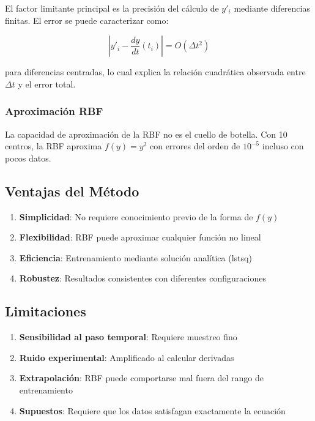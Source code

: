 \documentclass[11pt,a4paper]{article}
\begin{document}
El factor limitante principal es la precisión del cálculo de $y'_i$ mediante diferencias finitas. El error se puede caracterizar como:

\begin{equation}
\left| y'_i - \frac{dy}{dt}(t_i) \right| = O(\Delta t^2)
\end{equation}

para diferencias centradas, lo cual explica la relación cuadrática observada entre $\Delta t$ y el error total.

\subsubsection{Aproximación RBF}

La capacidad de aproximación de la RBF no es el cuello de botella. Con 10 centros, la RBF aproxima $f(y) = y^2$ con errores del orden de $10^{-5}$ incluso con pocos datos.

\subsection{Ventajas del Método}

\begin{enumerate}
    \item \textbf{Simplicidad}: No requiere conocimiento previo de la forma de $f(y)$
    \item \textbf{Flexibilidad}: RBF puede aproximar cualquier función no lineal
    \item \textbf{Eficiencia}: Entrenamiento mediante solución analítica (lstsq)
    \item \textbf{Robustez}: Resultados consistentes con diferentes configuraciones
\end{enumerate}

\subsection{Limitaciones}

\begin{enumerate}
    \item \textbf{Sensibilidad al paso temporal}: Requiere muestreo fino
    \item \textbf{Ruido experimental}: Amplificado al calcular derivadas
    \item \textbf{Extrapolación}: RBF puede comportarse mal fuera del rango de entrenamiento
    \item \textbf{Supuestos}: Requiere que los datos satisfagan exactamente la ecuación
\end{enumerate}
\end{document}
